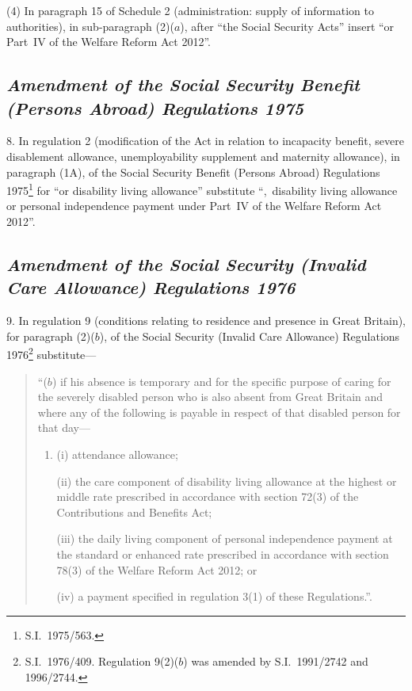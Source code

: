 \documentclass[12pt,a4paper]{article}
\begin{document}
(4) In paragraph 15 of Schedule 2 (administration: supply of information to authorities), in sub-paragraph (2)($a$), after “the Social Security Acts” insert “or Part~IV of the Welfare Reform Act 2012”.

\subsection*{\itshape Amendment of the Social Security Benefit (Persons Abroad) Regulations 1975}

8.  In regulation 2 (modification of the Act in relation to incapacity benefit, severe disablement allowance, unemployability supplement and maternity allowance), in paragraph (1A), of the Social Security Benefit (Persons Abroad) Regulations 1975\footnote{S.I.~1975/563.} for “or disability living allowance” substitute “,~disability living allowance or personal independence payment under Part~IV of the Welfare Reform Act 2012”.

\subsection*{\itshape Amendment of the Social Security (Invalid Care Allowance) Regulations 1976}

9.  In regulation 9 (conditions relating to residence and presence in Great Britain), for paragraph (2)($b$), of the Social Security (Invalid Care Allowance) Regulations 1976\footnote{S.I.~1976/409. Regulation 9(2)($b$)  was amended by S.I.~1991/2742 and 1996/2744.} substitute—
\begin{quotation}
“($b$) if his absence is temporary and for the specific purpose of caring for the severely disabled person who is also absent from Great Britain and where any of the following is payable in respect of that disabled person for that day—
\begin{enumerate}\item[]
(i) attendance allowance;

(ii) the care component of disability living allowance at the highest or middle rate prescribed in accordance with section 72(3) of the Contributions and Benefits Act;

(iii) the daily living component of personal independence payment at the standard or enhanced rate prescribed in accordance with section 78(3) of the Welfare Reform Act 2012; or

(iv) a payment specified in regulation 3(1) of these Regulations.”.
\end{enumerate}
\end{quotation}
\end{document}
